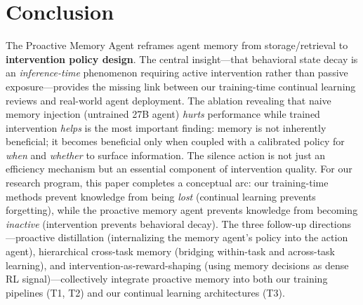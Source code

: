 \documentclass[11pt,a4paper]{article}
\begin{document}
\section{Conclusion}

The Proactive Memory Agent reframes agent memory from storage/retrieval to \textbf{intervention policy design}. The central insight---that behavioral state decay is an \emph{inference-time} phenomenon requiring active intervention rather than passive exposure---provides the missing link between our training-time continual learning reviews and real-world agent deployment. The ablation revealing that naive memory injection (untrained 27B agent) \emph{hurts} performance while trained intervention \emph{helps} is the most important finding: memory is not inherently beneficial; it becomes beneficial only when coupled with a calibrated policy for \emph{when} and \emph{whether} to surface information. The silence action is not just an efficiency mechanism but an essential component of intervention quality. For our research program, this paper completes a conceptual arc: our training-time methods prevent knowledge from being \emph{lost} (continual learning prevents forgetting), while the proactive memory agent prevents knowledge from becoming \emph{inactive} (intervention prevents behavioral decay). The three follow-up directions---proactive distillation (internalizing the memory agent's policy into the action agent), hierarchical cross-task memory (bridging within-task and across-task learning), and intervention-as-reward-shaping (using memory decisions as dense RL signal)---collectively integrate proactive memory into both our training pipelines (T1, T2) and our continual learning architectures (T3).
\end{document}
